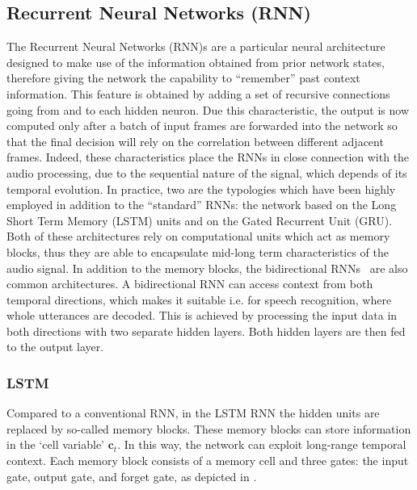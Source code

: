 \subsection{Recurrent Neural Networks (RNN)}

The Recurrent Neural Networks (RNN)s are a particular neural architecture designed to make use of the information obtained from prior network states, therefore giving the network the capability to ``remember'' past context information. This feature is obtained by adding a set of recursive connections going from and to each hidden neuron. Due this characteristic, the output is now computed only after a batch of input frames are forwarded into the network so that the final decision will rely on the correlation between different adjacent frames. Indeed, these characteristics place the RNNs in close connection with the audio processing, due to the sequential nature of the signal, which depends of its temporal evolution.
In practice, two are the typologies which have been highly employed in addition to the ``standard'' RNNs: the network based on the Long Short Term Memory (LSTM) units and on the Gated Recurrent Unit (GRU). Both of these architectures rely on computational units which act as memory blocks, thus they are able to encapsulate mid-long term characteristics of the audio signal.
In addition to the memory blocks, the bidirectional RNNs~\cite{schuster1997bidirectional} are also common architectures.
A bidirectional RNN can access context from both temporal directions, which makes it suitable i.e. for speech recognition, where whole utterances are decoded. This is achieved by processing the input data in both directions with two separate hidden layers.
Both hidden layers are then fed to the output layer.

\subsubsection{LSTM} Compared to a conventional RNN, in the LSTM RNN \cite{Hochreiter97-LST} the hidden units are replaced by so-called memory blocks.
These memory blocks can store information in the `cell variable' $\boldsymbol{c}_t$.
In this way, the network can exploit long-range temporal context.
Each memory block consists of a memory cell and three gates: the input gate, output gate, and forget gate, as depicted in .


